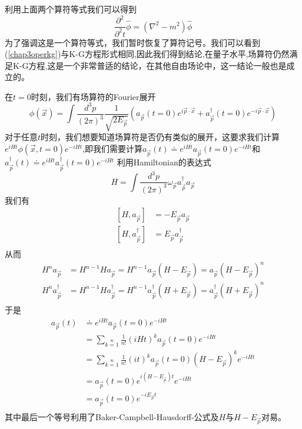 利用上面两个算符等式我们可以得到
\begin{equation}
\label{chap3operkg}
    \frac{\partial^{2}}{\partial^{2}t}\hat{\phi}=(\nabla^{2}-m^{2})\hat{\phi}
\end{equation}
为了强调这是一个算符等式，我们暂时恢复了算符记号。我们可以看到(\ref{chap3operkg})与K-G方程形式相同,因此我们得到结论,在量子水平,场算符仍然满足K-G方程,这是一个非常普适的结论，在其他自由场论中，这一结论一般也是成立的。

在$t=0$时刻，我们有场算符的Fourier展开
\begin{equation}
     \phi(\vec{x})=\int \frac{d^{3}p}{(2\pi)^{3}}\frac{1}{\sqrt{2E_{\vec{p}}}}\left(a_{\vec{p}}(t=0)e^{i\vec{p}\cdot\vec{x}}+a^{\dagger}_{\vec{p}}(t=0)e^{-i\vec{p}\cdot\vec{x}}\right)
\end{equation}
对于任意$t$时刻，我们想要知道场算符是否仍有类似的展开，这要求我们计算$e^{iHt}\phi(\vec{x},t=0)e^{-iHt}$,即我们需要计算$a_{\vec{p}}(t)\doteq e^{iHt}a_{\vec{p}}(t=0)e^{-iHt}$和$a_{\vec{p}}^{\dagger}(t)\doteq e^{iHt}a_{\vec{p}}^{\dagger}(t=0)e^{-iHt}$
利用Hamiltonian的表达式
\begin{equation}
    H=\int \frac{d^{3}p}{(2\pi)^{3}}\omega_{\vec{p}}a^{\dagger}_{\vec{p}}a_{\vec{p}}
\end{equation}
我们有
\begin{equation}
    \begin{aligned}
    \left[H,a_{\vec{p}}\right]&=-E_{\vec{p}}a_{\vec{p}}\\
    \left[H,a_{\vec{p}}^{\dagger}\right]&=E_{\vec{p}}a_{\vec{p}}^{\dagger}\\
    \end{aligned}
\end{equation}
从而
\begin{equation}
    \begin{aligned}
    H^{n}a_{\vec{p}}&=H^{n-1}Ha_{\vec{p}}=H^{n-1}a_{\vec{p}}(H-E_{\vec{p}})=a_{\vec{p}}(H-E_{\vec{p}})^{n}\\
     H^{n}a_{\vec{p}}^{\dagger}&=H^{n-1}Ha_{\vec{p}}^{\dagger}=H^{n-1}a^{\dagger}_{\vec{p}}(H+E_{\vec{p}})=a^{\dagger}_{\vec{p}}(H+E_{\vec{p}})^{n}\\
    \end{aligned}
\end{equation}
于是
\begin{equation}
\label{time1}
    \begin{aligned}
   a_{\vec{p}}(t)&\doteq e^{iHt}a_{\vec{p}}(t=0)e^{-iHt}\\
   &=\sum\limits_{k=1}\limits^{\infty}\frac{1}{n!}(iHt)^{k}a_{\vec{p}}(t=0)e^{-iHt}\\
   &=\sum\limits_{k=1}\limits^{\infty}\frac{1}{n!}(it)^{k}a_{\vec{p}}(t=0)(H-E_{\vec{p}})^{k}e^{-iHt}\\
   &=a_{\vec{p}}(t=0)e^{i(H-E_{\vec{p}})t}e^{-iHt}\\
   &=a_{\vec{p}}(t=0)e^{-iE_{\vec{p}}t}\\
    \end{aligned}
\end{equation}
其中最后一个等号利用了Baker-Campbell-Hausdorff-公式及$H$与$H-E_{\vec{p}}$对易。

